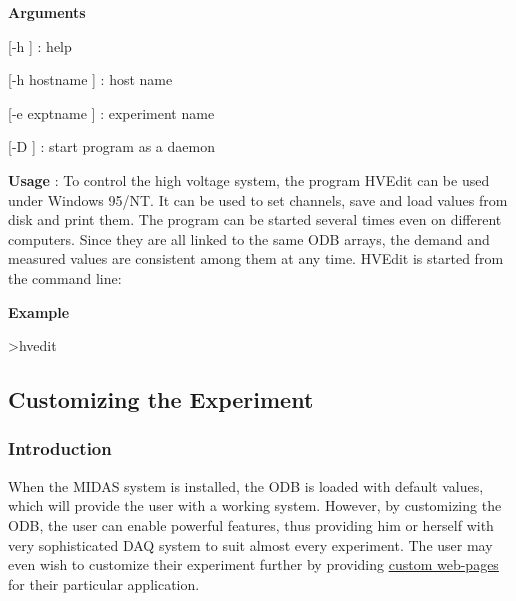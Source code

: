\begin{DoxyItemize}
\item {\bfseries  Arguments }
\begin{DoxyItemize}
\item \mbox{[}-\/h \mbox{]} : help
\item \mbox{[}-\/h hostname \mbox{]} : host name
\item \mbox{[}-\/e exptname \mbox{]} : experiment name
\item \mbox{[}-\/D \mbox{]} : start program as a daemon
\end{DoxyItemize}
\item {\bfseries  Usage }: To control the high voltage system, the program HVEdit can be used under Windows 95/NT. It can be used to set channels, save and load values from disk and print them. The program can be started several times even on different computers. Since they are all linked to the same ODB arrays, the demand and measured values are consistent among them at any time. HVEdit is started from the command line:
\item {\bfseries  Example } 
\begin{DoxyCode}
 >hvedit
\end{DoxyCode}

\end{DoxyItemize}

\par
  \par


\label{index_end}
\hypertarget{index_end}{}
 \subsection{Customizing the Experiment}\label{RC_customize_ODB}
\par
  \par
\hypertarget{RC_customize_ODB_RC_customize_intro}{}\subsubsection{Introduction}\label{RC_customize_ODB_RC_customize_intro}
When the MIDAS system is installed, the ODB is loaded with default values, which will provide the user with a working system. However, by customizing the ODB, the user can enable powerful features, thus providing him or herself with very sophisticated DAQ system to suit almost every experiment. The user may even wish to customize their experiment further by providing \hyperlink{RC_mhttpd_Custom_page}{custom web-\/pages} for their particular application.

